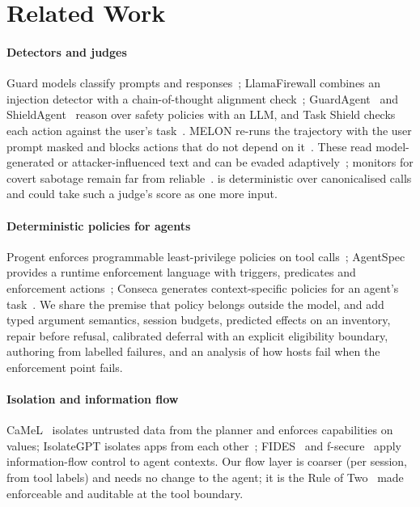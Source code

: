 \section{Related Work}
\label{sec:related}

\paragraph{Detectors and judges}
Guard models classify prompts and responses~\cite{llamaguard}; LlamaFirewall combines an injection detector with a chain-of-thought alignment check~\cite{llamafirewall}; GuardAgent~\cite{guardagent} and ShieldAgent~\cite{shieldagent} reason over safety policies with an LLM, and Task Shield checks each action against the user's task~\cite{taskshield}. MELON re-runs the trajectory with the user prompt masked and blocks actions that do not depend on it~\cite{melon}. These read model-generated or attacker-influenced text and can be evaded adaptively~\cite{adaptiveattacks}; monitors for covert sabotage remain far from reliable~\cite{shadearena}. \SystemNameCap{} is deterministic over canonicalised calls and could take such a judge's score as one more input.

\paragraph{Deterministic policies for agents}
Progent enforces programmable least-privilege policies on tool calls~\cite{progent}; AgentSpec provides a runtime enforcement language with triggers, predicates and enforcement actions~\cite{agentspec}; Conseca generates context-specific policies for an agent's task~\cite{conseca}. We share the premise that policy belongs outside the model, and add typed argument semantics, session budgets, predicted effects on an inventory, repair before refusal, calibrated deferral with an explicit eligibility boundary, authoring from labelled failures, and an analysis of how hosts fail when the enforcement point fails.

\paragraph{Isolation and information flow}
CaMeL~\cite{camel} isolates untrusted data from the planner and enforces capabilities on values; IsolateGPT isolates apps from each other~\cite{isolategpt}; FIDES~\cite{fides} and f-secure~\cite{fsecure} apply information-flow control to agent contexts. Our flow layer is coarser (per session, from tool labels) and needs no change to the agent; it is the Rule of Two~\cite{ruleoftwo} made enforceable and auditable at the tool boundary.

